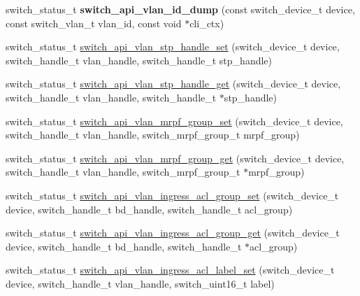 \begin{DoxyCompactItemize}
\item 
\hypertarget{group__VLAN_ga60814e5a5a9e9394a5cb4cd4c084aa94}{switch\+\_\+status\+\_\+t {\bfseries switch\+\_\+api\+\_\+vlan\+\_\+id\+\_\+dump} (const switch\+\_\+device\+\_\+t device, const switch\+\_\+vlan\+\_\+t vlan\+\_\+id, const void $\ast$cli\+\_\+ctx)}\label{group__VLAN_ga60814e5a5a9e9394a5cb4cd4c084aa94}

\item 
switch\+\_\+status\+\_\+t \hyperlink{group__VLAN_ga6acab509f2c4344f8146af032da7d287}{switch\+\_\+api\+\_\+vlan\+\_\+stp\+\_\+handle\+\_\+set} (switch\+\_\+device\+\_\+t device, switch\+\_\+handle\+\_\+t vlan\+\_\+handle, switch\+\_\+handle\+\_\+t stp\+\_\+handle)
\item 
switch\+\_\+status\+\_\+t \hyperlink{group__VLAN_gaa4e63e54839ae6fb16b4043a80643768}{switch\+\_\+api\+\_\+vlan\+\_\+stp\+\_\+handle\+\_\+get} (switch\+\_\+device\+\_\+t device, switch\+\_\+handle\+\_\+t vlan\+\_\+handle, switch\+\_\+handle\+\_\+t $\ast$stp\+\_\+handle)
\item 
switch\+\_\+status\+\_\+t \hyperlink{group__VLAN_gae46e00d7ebfcd79d5183f9e47eb1c6ad}{switch\+\_\+api\+\_\+vlan\+\_\+mrpf\+\_\+group\+\_\+set} (switch\+\_\+device\+\_\+t device, switch\+\_\+handle\+\_\+t vlan\+\_\+handle, switch\+\_\+mrpf\+\_\+group\+\_\+t mrpf\+\_\+group)
\item 
switch\+\_\+status\+\_\+t \hyperlink{group__VLAN_ga5ffd0ddf09678c08f3f035bb7993b6d4}{switch\+\_\+api\+\_\+vlan\+\_\+mrpf\+\_\+group\+\_\+get} (switch\+\_\+device\+\_\+t device, switch\+\_\+handle\+\_\+t vlan\+\_\+handle, switch\+\_\+mrpf\+\_\+group\+\_\+t $\ast$mrpf\+\_\+group)
\item 
switch\+\_\+status\+\_\+t \hyperlink{group__VLAN_ga551a24868ebed777ac6ce5eb4ab05b34}{switch\+\_\+api\+\_\+vlan\+\_\+ingress\+\_\+acl\+\_\+group\+\_\+set} (switch\+\_\+device\+\_\+t device, switch\+\_\+handle\+\_\+t bd\+\_\+handle, switch\+\_\+handle\+\_\+t acl\+\_\+group)
\item 
switch\+\_\+status\+\_\+t \hyperlink{group__VLAN_ga15d21aafeb415f51921402970a9a0086}{switch\+\_\+api\+\_\+vlan\+\_\+ingress\+\_\+acl\+\_\+group\+\_\+get} (switch\+\_\+device\+\_\+t device, switch\+\_\+handle\+\_\+t bd\+\_\+handle, switch\+\_\+handle\+\_\+t $\ast$acl\+\_\+group)
\item 
switch\+\_\+status\+\_\+t \hyperlink{group__VLAN_gada709abecd0a81f400147162a6de3e85}{switch\+\_\+api\+\_\+vlan\+\_\+ingress\+\_\+acl\+\_\+label\+\_\+set} (switch\+\_\+device\+\_\+t device, switch\+\_\+handle\+\_\+t vlan\+\_\+handle, switch\+\_\+uint16\+\_\+t label)

\end{DoxyCompactItemize}

